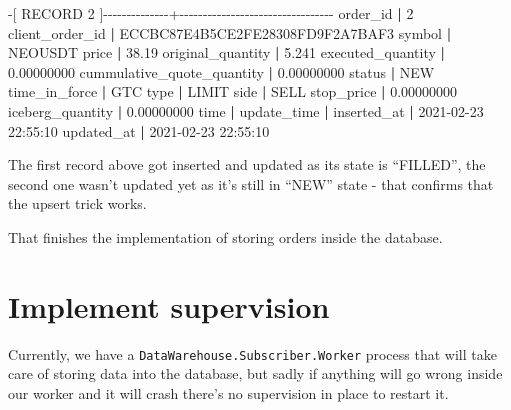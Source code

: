 \documentclass[
  oneside]{book}
\newenvironment{Shaded}{\begin{snugshade}}{\end{snugshade}}
\newcommand{\BuiltInTok}[1]{#1}
\newcommand{\ExtensionTok}[1]{#1}
\newcommand{\KeywordTok}[1]{\textcolor[rgb]{0.13,0.29,0.53}{\textbf{#1}}}
\newcommand{\NormalTok}[1]{#1}
\begin{document}
\begin{Shaded}
\begin{Highlighting}[]
\ExtensionTok{{-}[}\NormalTok{ RECORD 2 ]{-}{-}{-}{-}{-}{-}{-}{-}{-}{-}{-}{-}{-}{-}+{-}{-}{-}{-}{-}{-}{-}{-}{-}{-}{-}{-}{-}{-}{-}{-}{-}{-}{-}{-}{-}{-}{-}{-}{-}{-}{-}{-}{-}{-}{-}{-}{-}}
\ExtensionTok{order\_id}                   \KeywordTok{|} \ExtensionTok{2}
\ExtensionTok{client\_order\_id}            \KeywordTok{|} \ExtensionTok{ECCBC87E4B5CE2FE28308FD9F2A7BAF3}
\ExtensionTok{symbol}                     \KeywordTok{|} \ExtensionTok{NEOUSDT}
\ExtensionTok{price}                      \KeywordTok{|} \ExtensionTok{38.19}
\ExtensionTok{original\_quantity}          \KeywordTok{|} \ExtensionTok{5.241}
\ExtensionTok{executed\_quantity}          \KeywordTok{|} \ExtensionTok{0.00000000}
\ExtensionTok{cummulative\_quote\_quantity} \KeywordTok{|} \ExtensionTok{0.00000000}
\ExtensionTok{status}                     \KeywordTok{|} \ExtensionTok{NEW}
\ExtensionTok{time\_in\_force}              \KeywordTok{|} \ExtensionTok{GTC}
\BuiltInTok{type}                       \KeywordTok{|} \ExtensionTok{LIMIT}
\ExtensionTok{side}                       \KeywordTok{|} \ExtensionTok{SELL}
\ExtensionTok{stop\_price}                 \KeywordTok{|} \ExtensionTok{0.00000000}
\ExtensionTok{iceberg\_quantity}           \KeywordTok{|} \ExtensionTok{0.00000000}
\BuiltInTok{time}                       \KeywordTok{|} 
\ExtensionTok{update\_time}                \KeywordTok{|} 
\ExtensionTok{inserted\_at}                \KeywordTok{|} \ExtensionTok{2021{-}02{-}23}\NormalTok{ 22:55:10}
\ExtensionTok{updated\_at}                 \KeywordTok{|} \ExtensionTok{2021{-}02{-}23}\NormalTok{ 22:55:10}
\end{Highlighting}
\end{Shaded}

The first record above got inserted and updated as its state is ``FILLED'', the second one wasn't updated yet as it's still in ``NEW'' state - that confirms that the upsert trick works.

That finishes the implementation of storing orders inside the database.

\section{Implement supervision}\label{implement-supervision}

Currently, we have a \texttt{DataWarehouse.Subscriber.Worker} process that will take care of storing data into the database, but sadly if anything will go wrong inside our worker and it will crash there's no supervision in place to restart it.
\end{document}
